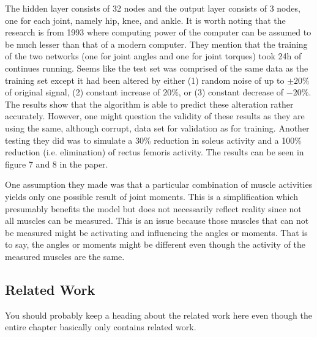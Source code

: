 The hidden layer consists of 32 nodes and the output layer consists of 3 nodes, one for each joint, namely hip, knee, and ankle.
It is worth noting that the research is from 1993 where computing power of the computer can be assumed to be much lesser than that of a modern computer.
They mention that the training of the two networks (one for joint angles and one for joint torques) took 24h of continues running.
Seems like the test set was comprised of the same data as the training set except it had been altered by either (1) random noise of up to $\pm 20\%$ of original signal, (2) constant increase of $20\%$, or (3) constant decrease of $-20\%$.
The results show that the algorithm is able to predict these alteration rather accurately. 
However, one might question the validity of these results as they are using the same, although corrupt, data set for validation as for training.
Another testing they did was to simulate a 30\% reduction in soleus activity and a 100\% reduction (i.e. elimination) of rectus femoris activity. 
The results can be seen in figure 7 and 8 in the paper.

One assumption they made was that a particular combination of muscle activities yields only one possible result of joint moments. This is a simplification which presumably benefits the model but does not necessarily reflect reality since not all muscles can be measured. This is an issue because those muscles that can not be measured might be activating and influencing the angles or moments. That is to say, the angles or moments might be different even though the activity of the measured muscles are the same.

\subsection{Related Work}
You should probably keep a heading about the related work here even though the entire chapter basically only contains related work.